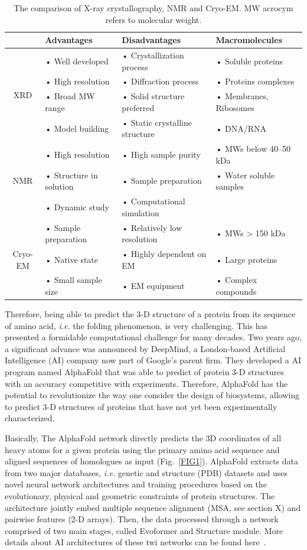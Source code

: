  \begin{table}[h!]
 	\begin{tabular}{cp{4cm}p{5cm}p{4.5cm}}
 		\hline
 		 & Advantages & Disadvantages & Macromolecules\\
 		 \hline
 		 \multirow{4}{*}{XRD} & • Well developed & • Crystallization process & • Soluble proteins \\
 		  & • High resolution & • Diffraction process
 		   & • Proteins complexes \\
 		  & • Broad MW range & • Solid structure preferred & • Membranes, Ribosomes \\
 		  & • Model building &• Static crystalline structure & • DNA/RNA \\
 		  \hline
 		 \multirow{3}{*}{NMR} & • High resolution & • High sample purity & • MWs below 40–50 kDa \\
 		 & • Structure in solution & • Sample preparation & • Water soluble samples\\
 		 & • Dynamic study	& • Computational simulation & \\
 		 \hline
 		 \multirow{3}{*}{Cryo-EM} & • Sample preparation & • Relatively low resolution
 		  & • MWs > 150 kDa\\
 		 & • Native state & • Highly dependent on EM & • Large proteins\\
 		 & • Small sample size	& • EM equipment & • Complex compounds \\
 		 \hline
 	\end{tabular}
 	\caption{The comparison of X-ray crystallography, NMR and Cryo-EM. MW acrocym refers to molecular weight.}
 	\label{TAB1}
 \end{table}
 
 Therefore, being able to predict the 3-D structure of a protein from its sequence of amino acid, \textit{i.e.} the folding phenomenon, is very challenging. This has presented a formidable computational challenge for many decades. Two years ago, a significant advance was announced by DeepMind, a London-based Artificial Intelligence (AI) company now part of Google’s parent firm. They developed a AI program named AlphaFold\cite{AlphaFold} that was able to predict of protein 3-D structures with an accuracy competitive with experiments. Therefore, AlphaFold has the potential to revolutionize the way one consider the design of biosystems, allowing to predict 3-D structures of proteins that have not yet been experimentally characterized.
 
 Basically, The AlphaFold network directly predicts the 3D coordinates of all heavy atoms for a given protein using the primary amino acid sequence and aligned sequences of homologues as input (Fig.~\ref{FIG1}). AlphaFold extracts data from two major databases, \textit{i.e.} genetic and structure (PDB) datasets and uses novel neural network architectures and training procedures based on the evolutionary, physical and geometric constraints of protein structures. The architecture jointly embed multiple sequence alignment (MSA, see section X) and pairwise features (2-D arrays). Then, the data processed through a network comprised of two main stages, called Evoformer and Structure module. More details about AI architectures of these twi networks can be found here~\cite{AlphaFold}.
 

